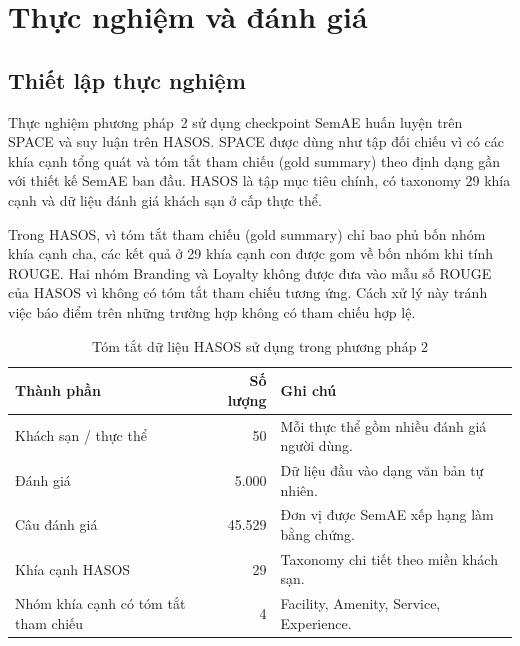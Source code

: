 \documentclass[12pt,a4paper]{report}
\begin{document}
\chapter{Thực nghiệm và đánh giá}

\section{Thiết lập thực nghiệm}

Thực nghiệm phương pháp~2 sử dụng checkpoint SemAE huấn luyện trên SPACE và suy luận trên HASOS. SPACE được dùng như tập đối chiếu vì có các khía cạnh tổng quát và tóm tắt tham chiếu (gold summary) theo định dạng gần với thiết kế SemAE ban đầu. HASOS là tập mục tiêu chính, có taxonomy 29 khía cạnh và dữ liệu đánh giá khách sạn ở cấp thực thể.

Trong HASOS, vì tóm tắt tham chiếu (gold summary) chỉ bao phủ bốn nhóm khía cạnh cha, các kết quả ở 29 khía cạnh con được gom về bốn nhóm khi tính ROUGE. Hai nhóm Branding và Loyalty không được đưa vào mẫu số ROUGE của HASOS vì không có tóm tắt tham chiếu tương ứng. Cách xử lý này tránh việc báo điểm trên những trường hợp không có tham chiếu hợp lệ.

\begin{table}[tbp]
\centering
\caption{Tóm tắt dữ liệu HASOS sử dụng trong phương pháp 2}
\label{tab:hasos-data-summary}
\begin{tabularx}{\textwidth}{L{0.28\textwidth} r Y}
\toprule
\textbf{Thành phần} & \textbf{Số lượng} & \textbf{Ghi chú} \\
\midrule
Khách sạn / thực thể & 50 & Mỗi thực thể gồm nhiều đánh giá người dùng. \\
Đánh giá & 5.000 & Dữ liệu đầu vào dạng văn bản tự nhiên. \\
Câu đánh giá & 45.529 & Đơn vị được SemAE xếp hạng làm bằng chứng. \\
Khía cạnh HASOS & 29 & Taxonomy chi tiết theo miền khách sạn. \\
Nhóm khía cạnh có tóm tắt tham chiếu & 4 & Facility, Amenity, Service, Experience. \\
\bottomrule
\end{tabularx}
\end{table}
\end{document}
